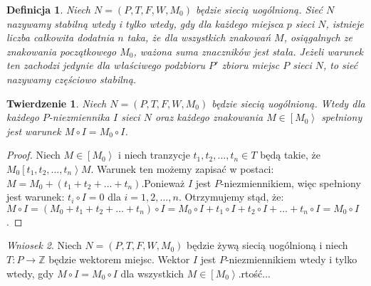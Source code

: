 \documentclass[a4paper,12pt]{book}
\newtheorem{df}{Definicja}
\newtheorem{tw}{Twierdzenie}
\theoremstyle{remark}
\newtheorem{concl}[df]{Wniosek}
\begin{document}
     

\begin{df}
Niech $N=(P,T,F,W,M_0)$ będzie siecią uogólnioną. Sieć $N$ nazywamy \textit{stabilną} wtedy i tylko wtedy, gdy dla każdego miejsca $p$ sieci $N$, istnieje liczba całkowita dodatnia $n$ taka, że dla wszystkich znakowań $M$, osiągalnych ze znakowania początkowego $M_0$, ważona suma znaczników jest stała. Jeżeli warunek ten zachodzi jedynie dla właściwego podzbioru $P'$ zbioru miejsc $P$ sieci $N$, to sieć nazywamy częściowo stabilną.
\end{df}

\begin{tw}
Niech $N=(P,T,F,W,M_0)$ będzie siecią uogólnioną. Wtedy dla każdego $P$-niezmiennika $I$ sieci $N$ oraz każdego znakowania $M \in \left[M_0\right>$ spełniony jest warunek $M \circ I = M_0 \circ I$.  
\end{tw}


\begin{proof}
Niech $M \in \left[M_0\right>$ i niech tranzycje $t_1,t_2,\dots,t_n \in T$ będą takie, że $M_0 \left[t_1,t_2,\dots,t_n\right> M$. Warunek ten możemy zapisać w postaci: $M = M_0 + (t_1+t_2+\dots+t_n)$.Ponieważ $I$ jest $P$-niezmiennikiem, więc spełniony jest warunek: $t_i \circ I = 0$ dla $i = 1,2,\dots,n$. Otrzymujemy stąd, że: $M \circ I = (M_0 + t_1+t_2+\dots+t_n) \circ I = M_0 \circ I + t_1 \circ I + t_2 \circ I + \dots + t_n \circ I = M_0 \circ I$.
\end{proof}

\begin{concl}
	Niech $N=(P,T,F,W,M_0)$ będzie żywą siecią uogólnioną i niech $T \colon P \to \mathbb{Z}$ będzie wektorem miejsc. Wektor $I$ jest $P$-niezmiennikiem wtedy i tylko wtedy, gdy $M \circ I = M_0 \circ I$ dla wszystkich $M \in \left[M_0\right>$.rtość...
\end{concl}
\end{document}
